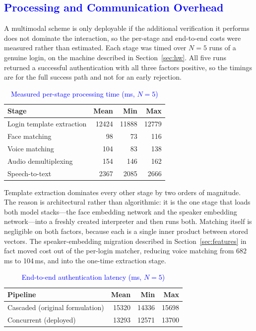\documentclass[10pt,journal,compsoc]{IEEEtran}
\begin{document}
{\color{blue}
\subsection{\textcolor{blue}{Processing and Communication Overhead}}\label{sec:perf}
A multimodal scheme is only deployable if the additional verification it performs does not dominate the interaction, so the per-stage and end-to-end costs were measured rather than estimated. Each stage was timed over $N=5$ runs of a genuine login, on the machine described in Section~\ref{sec:hw}. All five runs returned a successful authentication with all three factors positive, so the timings are for the full success path and not for an early rejection.

\begin{table}[!htbp]
\caption{\textcolor{blue}{Measured per-stage processing time (ms, $N=5$)}}
\label{tab:stages}
\centering
\begin{tabular}{|l|r|r|r|}
\hline
\textbf{Stage} & \textbf{Mean} & \textbf{Min} & \textbf{Max} \\ \hline
Login template extraction & 12424 & 11888 & 12779 \\
Face matching & 98 & 73 & 116 \\
Voice matching & 104 & 83 & 138 \\
Audio demultiplexing & 154 & 146 & 162 \\
Speech-to-text & 2367 & 2085 & 2666 \\
\hline
\end{tabular}
\end{table}

Template extraction dominates every other stage by two orders of magnitude. The reason is architectural rather than algorithmic: it is the one stage that loads both model stacks---the face embedding network and the speaker embedding network---into a freshly created interpreter and then runs both. Matching itself is negligible on both factors, because each is a single inner product between stored vectors. The speaker-embedding migration described in Section~\ref{sec:features} in fact moved cost out of the per-login matcher, reducing voice matching from 682\,ms to 104\,ms, and into the one-time extraction stage.

\begin{table}[!htbp]
\caption{\textcolor{blue}{End-to-end authentication latency (ms, $N=5$)}}
\label{tab:e2e}
\centering
\begin{tabular}{|l|r|r|r|}
\hline
\textbf{Pipeline} & \textbf{Mean} & \textbf{Min} & \textbf{Max} \\ \hline
Cascaded (original formulation) & 15320 & 14336 & 15698 \\
Concurrent (deployed) & 13293 & 12571 & 13700 \\
\hline
\end{tabular}
\end{table}

}
\end{document}
